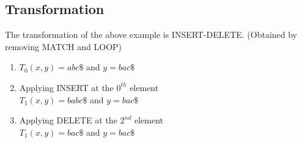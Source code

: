 \documentclass{article}
\begin{document}
\subsection*{Transformation}
The transformation of the above example is INSERT-DELETE. (Obtained by removing 
MATCH and LOOP)\\
\begin{enumerate}
    \item $T_0(x,y)=abc\$$ and $y=bac\$$
    \item Applying INSERT at the $0^{th}$ element\\
    $T_1(x,y)=babc\$$ and $y=bac\$$
    \item Applying DELETE at the $2^{nd}$ element\\
    $T_1(x,y)=bac\$$ and $y=bac\$$
\end{enumerate}
\end{document}
